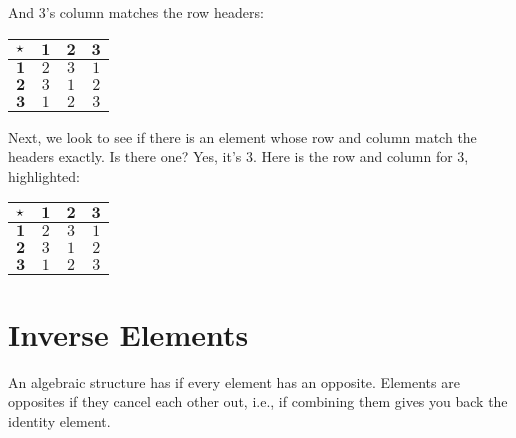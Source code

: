 \documentclass[../../../main.tex]{subfiles}
\begin{document}
\begin{example}
\begin{aside}
\begin{remark}
And $3$'s column matches the row headers:

\begin{center}
  \begin{tabular}{| c || c | c | c | }
    \hline
    $\opSymbol/$ & $\mathbf{1}$ & $\mathbf{2}$ & $\mathbf{3}$ \\ \hline \hline
    \cellcolor{grey3} $\mathbf{1}$          & $2$ & $3$ & \cellcolor{grey3} $1$ \\ \hline
    \cellcolor{grey3} $\mathbf{2}$          & $3$ & $1$ & \cellcolor{grey3} $2$ \\ \hline
    \cellcolor{grey3} $\mathbf{3}$          & $1$ & $2$ & \cellcolor{grey3} $3$ \\ \hline
  \end{tabular}
\end{center}

  \end{remark}
\end{aside}

Next, we look to see if there is an element whose row and column match the headers exactly. Is there one? Yes, it's $3$. Here is the row and column for $3$, highlighted:

\begin{center}
  \begin{tabular}{| c || c | c | c | }
    \hline
    $\opSymbol/$ & $\mathbf{1}$ & $\mathbf{2}$ & $\mathbf{3}$ \\ \hline \hline
    $\mathbf{1}$          & $2$ & $3$ & \cellcolor{grey3} $1$ \\ \hline
    $\mathbf{2}$          & $3$ & $1$ & \cellcolor{grey3} $2$ \\ \hline
    $\mathbf{3}$          & \cellcolor{grey3} $1$ & \cellcolor{grey3} $2$ & \cellcolor{grey3} $3$ \\ \hline
  \end{tabular}
\end{center}

\end{example}



\section{Inverse Elements}

\begin{terminology}
  An algebraic structure has  if every element has an opposite. Elements are opposites if they cancel each other out, i.e., if combining them gives you back the identity element.
\end{terminology}
\end{document}
